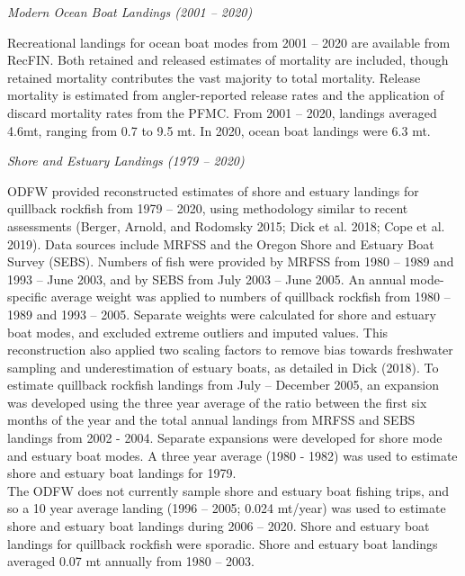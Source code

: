 \documentclass[11pt,
  english,
  a4paper,
]{article}
\begin{document}
\leavevmode\tagmcend\tagstructend\par


\emph{Modern Ocean Boat Landings (2001 -- 2020)}

\leavevmode\tagmcend\tagstructend\par


Recreational landings for ocean boat modes from 2001 -- 2020 are available from RecFIN. Both retained and released estimates of mortality are included, though retained mortality contributes the vast majority to total mortality. Release mortality is estimated from angler-reported release rates and the application of discard mortality rates from the PFMC. From 2001 -- 2020, landings averaged 4.6mt, ranging from 0.7 to 9.5 mt. In 2020, ocean boat landings were 6.3 mt.

\leavevmode\tagmcend\tagstructend\par


\emph{Shore and Estuary Landings (1979 -- 2020)}

\leavevmode\tagmcend\tagstructend\par


ODFW provided reconstructed estimates of shore and estuary landings for quillback rockfish from 1979 -- 2020, using methodology similar to recent assessments {(Berger, Arnold, and Rodomsky 2015; Dick et al. 2018; Cope et al. 2019)\leavevmode\tagmcend\tagstructend}. Data sources include MRFSS and the Oregon Shore and Estuary Boat Survey (SEBS). Numbers of fish were provided by MRFSS from 1980 -- 1989 and 1993 -- June 2003, and by SEBS from July 2003 -- June 2005. An annual mode-specific average weight was applied to numbers of quillback rockfish from 1980 -- 1989 and 1993 -- 2005. Separate weights were calculated for shore and estuary boat modes, and excluded extreme outliers and imputed values. This reconstruction also applied two scaling factors to remove bias towards freshwater sampling and underestimation of estuary boats, as detailed in Dick {(2018)\leavevmode\tagmcend\tagstructend}. To estimate quillback rockfish landings from July -- December 2005, an expansion was developed using the three year average of the ratio between the first six months of the year and the total annual landings from MRFSS and SEBS landings from 2002 - 2004. Separate expansions were developed for shore mode and estuary boat modes. A three year average (1980 - 1982) was used to estimate shore and estuary boat landings for 1979.\\
The ODFW does not currently sample shore and estuary boat fishing trips, and so a 10 year average landing (1996 -- 2005; 0.024 mt/year) was used to estimate shore and estuary boat landings during 2006 -- 2020. Shore and estuary boat landings for quillback rockfish were sporadic. Shore and estuary boat landings averaged 0.07 mt annually from 1980 -- 2003.
\end{document}
